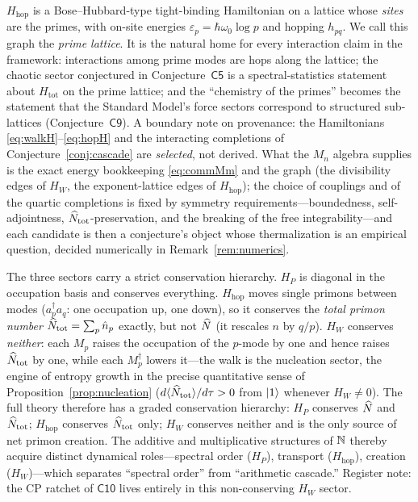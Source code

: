 \begin{remark}
$H_{\mathrm{hop}}$ is a Bose--Hubbard-type tight-binding Hamiltonian on a lattice whose
\emph{sites} are the primes, with on-site energies $\varepsilon_{p}=\hbar\omega_{0}\log p$ and
hopping $h_{pq}$. We call this graph the \emph{prime lattice}. It is the natural home for
every interaction claim in the framework: interactions among prime modes are hops along the
lattice; the chaotic sector conjectured in Conjecture~$\mathsf{C5}$ is a spectral-statistics
statement about $H_{\mathrm{tot}}$ on the prime lattice; and the ``chemistry of the
primes'' becomes the statement that the Standard Model's force sectors correspond
to structured sub-lattices (Conjecture~$\mathsf{C9}$). A boundary note on provenance: the
Hamiltonians \eqref{eq:walkH}--\eqref{eq:hopH} and the interacting completions of
Conjecture~\ref{conj:cascade} are \emph{selected}, not derived. What the $M_{n}$ algebra
supplies is the exact energy bookkeeping \eqref{eq:commMm} and the graph (the divisibility
edges of $H_{W}$, the exponent-lattice edges of $H_{\mathrm{hop}}$); the choice of couplings
and of the quartic completions is fixed by symmetry requirements---boundedness,
self-adjointness, $\widehat{N}_{\mathrm{tot}}$-preservation, and the breaking of the free
integrability---and each candidate is then a conjecture's object whose thermalization is an
empirical question, decided numerically in Remark~\ref{rem:numerics}.
\end{remark}

\begin{remark}\label{rem:conservation}
The three sectors carry a strict conservation hierarchy. $H_{P}$ is diagonal in the occupation
basis and conserves everything. $H_{\mathrm{hop}}$ moves single primons between modes
($a_{p}^{\dagger}a_{q}$: one occupation up, one down), so it conserves the \emph{total primon
number} $\widehat{N}_{\mathrm{tot}}=\sum_{p}\hat n_{p}$ exactly, but not $\widehat{N}$ (it rescales $n$ by
$q/p$). $H_{W}$ conserves \emph{neither}: each $M_{p}$ raises the occupation of the $p$-mode by
one and hence raises $\widehat{N}_{\mathrm{tot}}$ by one, while each $M_{p}^{\dagger}$ lowers it---the
walk is the nucleation sector, the engine of entropy growth in the precise quantitative sense
of Proposition~\ref{prop:nucleation} ($d\langle\widehat{N}_{\mathrm{tot}}\rangle/d\tau>0$ from
$\lvert 1\rangle$ whenever $H_{W}\neq0$). The full theory therefore has a graded conservation
hierarchy: $H_{P}$ conserves $\widehat{N}$ and $\widehat{N}_{\mathrm{tot}}$; $H_{\mathrm{hop}}$ conserves
$\widehat{N}_{\mathrm{tot}}$ only; $H_{W}$ conserves neither and is the only source of net primon
creation. The additive and multiplicative structures of $\mathbb{N}$ thereby acquire distinct
dynamical roles---spectral order ($H_{P}$), transport ($H_{\mathrm{hop}}$), creation
($H_{W}$)---which separates ``spectral order'' from
``arithmetic cascade.'' Register note: the CP ratchet of $\mathsf{C10}$ lives entirely in this
non-conserving $H_{W}$ sector.
\end{remark}

